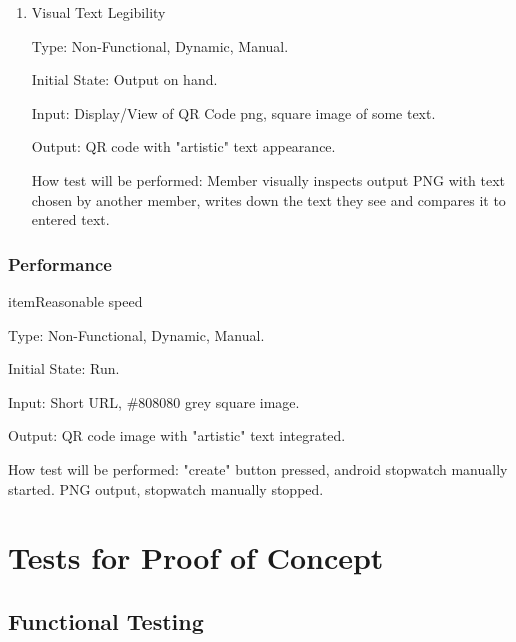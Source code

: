 \documentclass[12pt, titlepage]{article}
\begin{document}
\begin{enumerate}
\begin{enumerate}
\item{Visual Text Legibility\\}

Type: Non-Functional, Dynamic, Manual.
					
Initial State: Output on hand.
					
Input: Display/View of QR Code png, square image of some text.
					
Output: QR code with "artistic" text appearance.
					
How test will be performed: Member visually inspects output PNG with text chosen by another member, writes down the text they see and compares it to entered text.

\end{enumerate}

\subsubsection{Performance}

item{Reasonable speed\\}  %

Type: Non-Functional, Dynamic, Manual.
					
Initial State: Run. 
					
Input: Short URL, \#808080 grey square image.
					
Output: QR code image with "artistic" text integrated.
					
How test will be performed: "create" button pressed, android stopwatch manually started. PNG output, stopwatch manually stopped.

\end{enumerate}

\section{Tests for Proof of Concept}

\subsection{Functional Testing}
\end{document}
